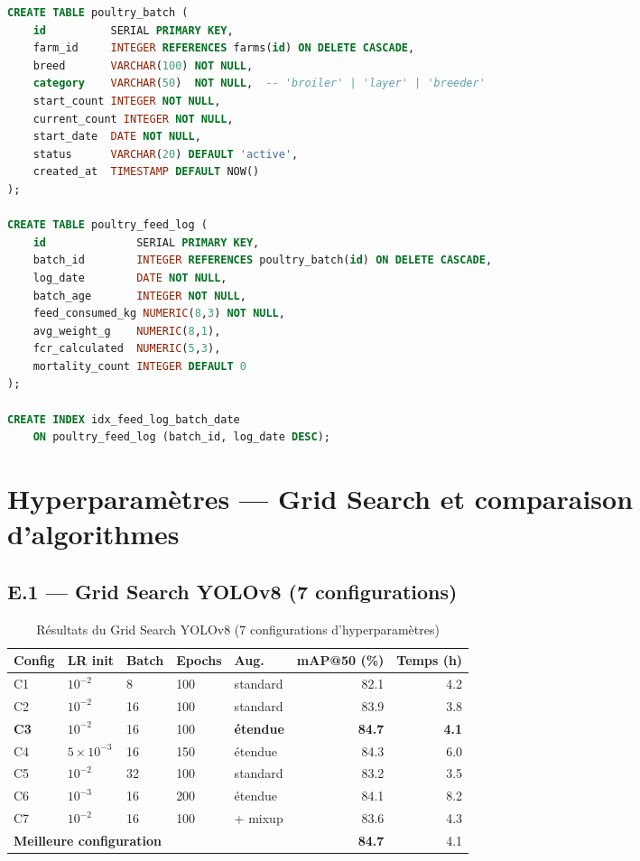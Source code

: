 \documentclass[12pt,a4paper,twoside]{report}
\begin{document}
\begin{lstlisting}[language=sql, caption={Schéma SQL simplifié — module aviculture}]
CREATE TABLE poultry_batch (
    id          SERIAL PRIMARY KEY,
    farm_id     INTEGER REFERENCES farms(id) ON DELETE CASCADE,
    breed       VARCHAR(100) NOT NULL,
    category    VARCHAR(50)  NOT NULL,  -- 'broiler' | 'layer' | 'breeder'
    start_count INTEGER NOT NULL,
    current_count INTEGER NOT NULL,
    start_date  DATE NOT NULL,
    status      VARCHAR(20) DEFAULT 'active',
    created_at  TIMESTAMP DEFAULT NOW()
);

CREATE TABLE poultry_feed_log (
    id              SERIAL PRIMARY KEY,
    batch_id        INTEGER REFERENCES poultry_batch(id) ON DELETE CASCADE,
    log_date        DATE NOT NULL,
    batch_age       INTEGER NOT NULL,
    feed_consumed_kg NUMERIC(8,3) NOT NULL,
    avg_weight_g    NUMERIC(8,1),
    fcr_calculated  NUMERIC(5,3),
    mortality_count INTEGER DEFAULT 0
);

CREATE INDEX idx_feed_log_batch_date
    ON poultry_feed_log (batch_id, log_date DESC);
\end{lstlisting}

\chapter{Hyperparamètres — Grid Search et comparaison d'algorithmes}
\label{ann:hyperparams}

\section*{E.1 — Grid Search YOLOv8 (7 configurations)}

\begin{table}[H]
\centering
\caption{Résultats du Grid Search YOLOv8 (7 configurations d'hyperparamètres)}
\label{tab:gs_yolo}
\begin{tabular}{lllllrr}
\toprule
\textbf{Config} & \textbf{LR init} & \textbf{Batch} & \textbf{Epochs} & \textbf{Aug.} & \textbf{mAP@50 (\%)} & \textbf{Temps (h)} \\
\midrule
C1 & $10^{-2}$ & 8  & 100 & standard   & 82.1 & 4.2 \\
C2 & $10^{-2}$ & 16 & 100 & standard   & 83.9 & 3.8 \\
\textbf{C3} & $10^{-2}$ & 16 & 100 & \textbf{étendue} & \textbf{84.7} & \textbf{4.1} \\
C4 & $5\times10^{-3}$ & 16 & 150 & étendue & 84.3 & 6.0 \\
C5 & $10^{-2}$ & 32 & 100 & standard   & 83.2 & 3.5 \\
C6 & $10^{-3}$ & 16 & 200 & étendue    & 84.1 & 8.2 \\
C7 & $10^{-2}$ & 16 & 100 & + mixup    & 83.6 & 4.3 \\
\midrule
\multicolumn{5}{l}{\textbf{Meilleure configuration}} & \textbf{84.7} & 4.1 \\
\bottomrule
\end{tabular}
\end{table}
\end{document}
